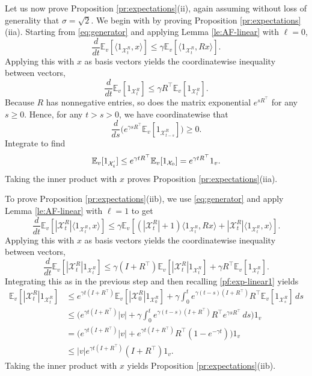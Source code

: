 \documentclass[11pt,reqno]{amsart}
\numberwithin{equation}{section}
\theoremstyle{definition}
\def\E{{\mathbb E}}
\def\X{{\mathcal X}}
\begin{document}
Let us now prove Proposition \ref{pr:expectations}(ii), again assuming without loss of generality that $\sigma = \sqrt{2}$. We begin with by proving Proposition \ref{pr:expectations}(iia). Starting from \eqref{eq:generator} and applying Lemma \ref{le:AF-linear} with $\ell=0$,
\begin{equation*}
\frac{d}{dt} \E_v[\langle 1_{\X^{R}_t},x\rangle ] \le \gamma \E_v[\langle 1_{\X^{R}_t}, R x\rangle ].
\end{equation*}
Applying this with $x$ as basis vectors yields the coordinatewise inequality between vectors,
\begin{equation*}
\frac{d}{dt} \E_v[ 1_{\X^{R}_t} ] \le \gamma R^\top \E_v[  1_{\X^{R}_t}  ].
\end{equation*}
Because $R$ has nonnegative entries, so does the matrix exponential $e^{s R^\top}$ for any $s \ge 0$. Hence, for any $t > s > 0$, we have coordinatewise that
\begin{equation*}
\frac{d}{ds}\big( e^{\gamma sR^\top}\E_v[ 1_{\X^{R}_{t-s}} ]\big) \ge 0.
\end{equation*}
Integrate to find
\begin{equation}
\E_v[ 1_{\X^{`}_t} ] \le e^{\gamma tR^\top}\E_v[ 1_{\X_0} ] =  e^{\gamma tR^\top} 1_v.   \label{pf:exp-linear1}
\end{equation}
Taking the inner product with $x$ proves Proposition \ref{pr:expectations}(iia).

To prove Proposition \ref{pr:expectations}(iib), we use \eqref{eq:generator} and apply Lemma \ref{le:AF-linear} with $\ell=1$ to get
\begin{equation*}
\frac{d}{dt} \E_v[|\X^{R}_t|\langle 1_{\X^{R}_t},x\rangle ] \le \gamma \E_v[ (|\X^{R}_t|+1)\langle 1_{\X^{R}_t},R x\rangle + |\X^{R}_t|\langle 1_{\X^{R}_t}, x\rangle ].
\end{equation*}
Applying this with $x$ as basis vectors yields the coordinatewise inequality between vectors,
\begin{equation*}
\frac{d}{dt} \E_v[ |\X^{R}_t|1_{\X^{R}_t} ] \le \gamma(I + R^\top) \E_v[ |\X^{R}_t| 1_{\X^{R}_t}] + \gamma R^\top \E_v[1_{\X^{R}_t}] .
\end{equation*}
Integrating this as in the previous step and then recalling \eqref{pf:exp-linear1} yields
\begin{align}
\E_v[ |\X^{R}_t|1_{\X^{R}_t} ] &\le e^{\gamma t (I+R^\top)}\E_v[ |\X^{R}_0|1_{\X^{R}_0} ] + \gamma \int_0^t e^{\gamma(t-s) (I+R^\top)}  R^\top \E_v[1_{\X^{R}_s}]\,ds \nonumber \\
	&\le \bigg(e^{\gamma t (I+R^\top)}|v| + \gamma \int_0^t e^{\gamma(t-s) (I+R^\top)}  R^\top  e^{\gamma sR^\top} \,ds\bigg)1_v  \nonumber \\
	&= \bigg(e^{\gamma t (I+R^\top)}|v| + e^{\gamma t(I+R^\top)} R^\top (1-e^{-\gamma t})\bigg)1_v \nonumber \\
	&\le |v|e^{\gamma t(I+R^\top)}(I+R^\top)1_v. \label{pf:exp-linear2}
\end{align}
Taking the inner product with $x$ yields Proposition \ref{pr:expectations}(iib).
\end{document}
